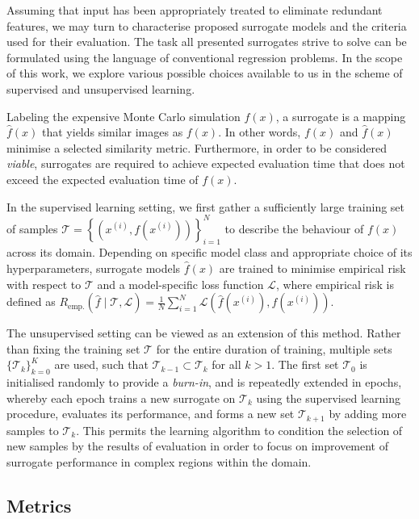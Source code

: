Assuming that input has been appropriately treated to eliminate redundant
features, we may turn to characterise proposed surrogate models and the criteria
used for their evaluation. The task all presented surrogates strive to solve can be
formulated using the language of conventional regression problems. In the scope
of this work, we explore various possible choices available to us in the
scheme of supervised and unsupervised learning.

Labeling the expensive Monte Carlo simulation $f(x)$, a surrogate is a mapping
$\hat{f}(x)$ that yields similar images as $f(x)$. In other words, $f(x)$ and
$\hat{f}(x)$ minimise a selected similarity metric. Furthermore, in order to
be considered \textit{viable}, surrogates are required to achieve expected evaluation time
that does not exceed the expected evaluation time of $f(x)$.

In the supervised learning setting, we first gather a sufficiently large
training set of samples $\mathcal{T}=\left\{\left( x^{(i)},f\left(x^{(i)}\right) \right)\right\}_{i=1}^N$
to describe the behaviour of $f(x)$ across its domain.
Depending on specific model class and appropriate choice of its
hyperparameters, surrogate models $\hat{f}(x)$ are trained to minimise
empirical risk with respect to $\mathcal{T}$ and a model-specific
loss function $\mathcal{L}$, where empirical risk is defined as
$R_{\text{emp.}}(\hat{f}\mid\mathcal{T},\mathcal{L})
	=\frac{1}{N}\sum_{i=1}^N
	\mathcal{L}\left(\hat{f}(x^{(i)}),f(x^{(i)})\right)$.


The unsupervised setting can be viewed as an extension of this method.
Rather than fixing the training set $\mathcal{T}$ for the entire duration of
training, multiple sets $\{\mathcal{T}_k\}_{k=0}^K$ are used, such that
$\mathcal{T}_{k-1}\subset\mathcal{T}_k$ for all $k>1$. The first set
$\mathcal{T}_0$ is initialised randomly to provide a \textit{burn-in}, and is
repeatedly extended in epochs, whereby each epoch trains a new surrogate on
$\mathcal{T}_k$ using the supervised learning procedure, evaluates its
performance, and forms a new set $\mathcal{T}_{k+1}$ by adding more samples to
$\mathcal{T}_k$. This permits the learning algorithm to condition the selection
of new samples by the results of evaluation in order to focus on improvement of
surrogate performance in complex regions within the domain.


\subsection{Metrics}
\label{sec:metrics}

